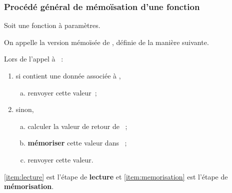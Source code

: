 \begin{frame}[fragile]
\frametitle{Procédé général de mémoïsation d'une fonction}
Soit  une fonction à  paramètres.
\bigskip

On appelle  la \alert{version mémoïsée} de , définie de la
manière suivante.
\medskip

Lors de l'appel à ~:
\medskip

\begin{enumerate}[(1)]
    \item \label{item:lecture}
    si  contient une donnée associée à ,
    \begin{enumerate}[(a)] \normalsize
        \item renvoyer cette valeur~;
    \end{enumerate}
    \medskip

    \item \label{item:memorisation}
    sinon,
    \begin{enumerate}[(a)] \normalsize
        \item calculer la valeur de retour de ~;
        \item {\bf mémoriser} cette valeur dans ~;
        \item renvoyer cette valeur.
    \end{enumerate}
\end{enumerate}
\bigskip

\eqref{item:lecture} est l'étape de {\bf lecture} et \eqref{item:memorisation}
est l'étape de {\bf mémorisation}.
\end{frame}

